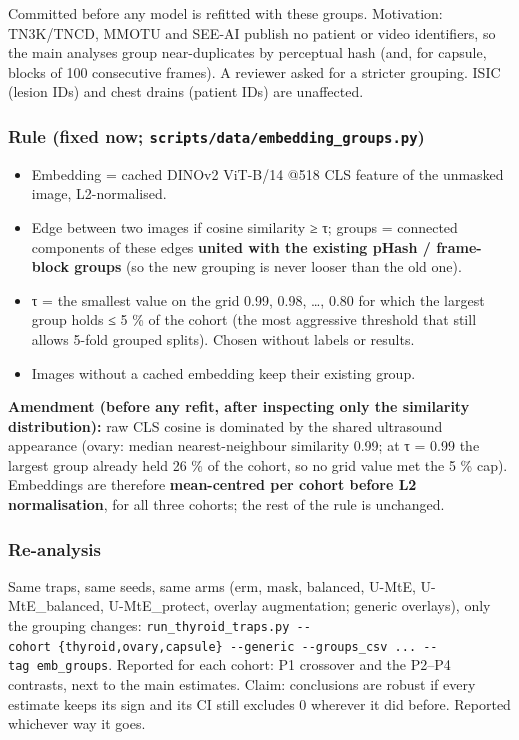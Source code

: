 {\small
Committed before any model is refitted with these groups. Motivation: TN3K/TNCD, MMOTU and SEE-AI publish no patient
or video identifiers, so the main analyses group near-duplicates by perceptual hash (and, for capsule, blocks of 100
consecutive frames). A reviewer asked for a stricter grouping. ISIC (lesion IDs) and chest drains (patient IDs) are
unaffected.

\subsubsection{\texorpdfstring{Rule (fixed now; \texttt{scripts/data/embedding\_groups.py})}{Rule (fixed now; scripts/data/embedding\_groups.py)}}\label{rule-fixed-now-scriptsdataembedding_groupspy}

\begin{itemize}

\item
  Embedding = cached DINOv2 ViT-B/14 @518 CLS feature of the unmasked image, L2-normalised.
\item
  Edge between two images if cosine similarity ≥ τ; groups = connected components of these edges \textbf{united with the
  existing pHash / frame-block groups} (so the new grouping is never looser than the old one).
\item
  τ = the smallest value on the grid 0.99, 0.98, \ldots, 0.80 for which the largest group holds ≤ 5 \% of the cohort
  (the most aggressive threshold that still allows 5-fold grouped splits). Chosen without labels or results.
\item
  Images without a cached embedding keep their existing group.
\end{itemize}

\textbf{Amendment (before any refit, after inspecting only the similarity distribution):} raw CLS cosine is dominated by
the shared ultrasound appearance (ovary: median nearest-neighbour similarity 0.99; at τ = 0.99 the largest group
already held 26 \% of the cohort, so no grid value met the 5 \% cap). Embeddings are therefore \textbf{mean-centred per cohort
before L2 normalisation}, for all three cohorts; the rest of the rule is unchanged.

\subsubsection{Re-analysis}\label{re-analysis}

Same traps, same seeds, same arms (erm, mask, balanced, U-MtE, U-MtE\_balanced, U-MtE\_protect, overlay augmentation;
generic overlays), only the grouping changes: \texttt{run\_thyroid\_traps.py\ -\/-cohort\ \{thyroid,ovary,capsule\}\ -\/-generic\ -\/-groups\_csv\ ...\ -\/-tag\ emb\_groups}. Reported for each cohort: P1 crossover and the P2--P4 contrasts, next to the main
estimates. Claim: conclusions are robust if every estimate keeps its sign and its CI still excludes 0 wherever it did
before. Reported whichever way it goes.

}
